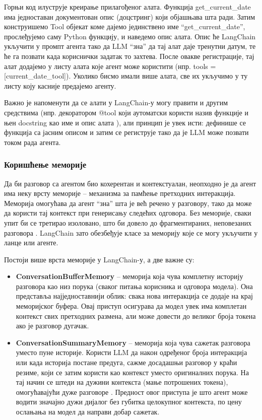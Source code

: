 Горњи код илуструје креирање прилагођеног алата. Функција get\_current\_date има једноставан документован опис (доцстринг) који објашњава шта ради. Затим конструишемо Tool објекат коме дајемо јединствено име ``get\_current\_date'', прослеђујемо саму Python функцију, и наведемо опис алата. Опис ће LangChain укључити у промпт агента тако да LLM ``зна'' да тај алат даје тренутни датум, те ће га позвати када кориснички задатак то захтева. После овакве регистрације, тај алат додајемо у листу алата које агент може користити (нпр. tools = [current\_date\_tool]). Уколико бисмо имали више алата, све их укључимо у ту листу коју касније предајемо агенту.

Важно је напоменути да се алати у LangChain-у могу правити и другим средствима (нпр. декоратором @tool који аутоматски користи назив функције и њен docstring као име и опис алата \cite{langchain_docs_2024}), али принцип је увек исти: дефинише се функција са јасним описом и затим се региструје тако да је LLM може позвати током рада агента.

\subsubsection{Коришћење меморије}

Да би разговор са агентом био кохерентан и контекстуалан, неопходно је да агент има неку врсту меморије -- механизма за памћење претходних интеракција. Меморија омогућава да агент ``зна'' шта је већ речено у разговору, тако да може да користи тај контекст при генерисању следећих одговора. Без меморије, сваки упит би се третирао изоловано, што би довело до фрагментираних, неповезаних разговора \cite{langchain_docs_2024}. LangChain зато обезбеђује класе за меморију које се могу укључити у ланце или агенте.

Постоји више врста меморије у LangChain-у, а две важне су:
\begin{itemize}
    \item \textbf{ConversationBufferMemory} -- меморија која чува комплетну историју разговора као низ порука (сваког питања корисника и одговора модела). Она представља најједноставнији облик: свака нова интеракција се додаје на крај меморијског буфера. Овај приступ осигурава да модел увек има комплетан контекст свих претходних размена, али може довести до великог броја токена ако је разговор дугачак.
    \item \textbf{ConversationSummaryMemory} -- меморија која чува сажетак разговора уместо пуне историје. Користи LLM да након одређеног броја интеракција или када историја постане предуга, сажме досадашњи разговор у краћи резиме, који се затим користи као контекст уместо оригиналних порука. На тај начин се штеди на дужини контекста (мање потрошених токена), омогућавајући дуже разговоре \cite{langchain_docs_2024}. Предност овог приступа је што агент може водити значајно дужи дијалог без губитка целокупног контекста, по цену ослањања на модел да направи добар сажетак.
\end{itemize}

